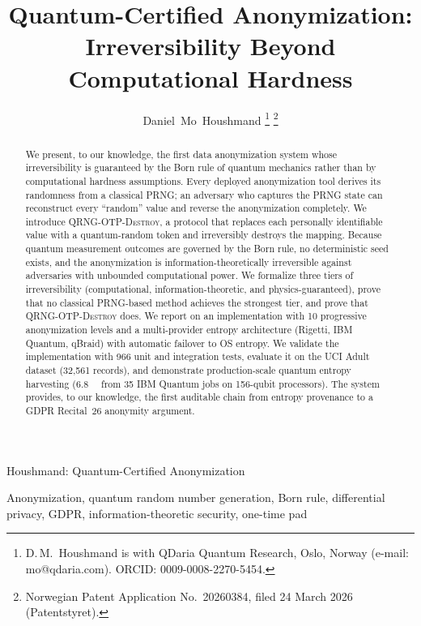 \documentclass[journal]{IEEEtran}
\begin{document}
\title{Quantum-Certified Anonymization: Irreversibility Beyond Computational Hardness}

\author{Daniel~Mo~Houshmand%
\thanks{D.\,M.\ Houshmand is with QDaria Quantum Research, Oslo, Norway (e-mail: mo@qdaria.com). ORCID: 0009-0008-2270-5454.}%
\thanks{Norwegian Patent Application No.\ 20260384, filed 24 March 2026 (Patentstyret).}}

%
{Houshmand: Quantum-Certified Anonymization}

\maketitle

\begin{abstract}
We present, to our knowledge, the first data anonymization system whose irreversibility is guaranteed by the Born rule of quantum mechanics rather than by computational hardness assumptions. Every deployed anonymization tool derives its randomness from a classical PRNG; an adversary who captures the PRNG state can reconstruct every ``random'' value and reverse the anonymization completely. We introduce \textsc{QRNG-OTP-Destroy}, a protocol that replaces each personally identifiable value with a quantum-random token and irreversibly destroys the mapping. Because quantum measurement outcomes are governed by the Born rule, no deterministic seed exists, and the anonymization is information-theoretically irreversible against adversaries with unbounded computational power. We formalize three tiers of irreversibility (computational, information-theoretic, and physics-guaranteed), prove that no classical PRNG-based method achieves the strongest tier, and prove that \textsc{QRNG-OTP-Destroy} does. We report on an implementation with 10 progressive anonymization levels and a multi-provider entropy architecture (Rigetti, IBM Quantum, qBraid) with automatic failover to OS entropy. We validate the implementation with 966 unit and integration tests, evaluate it on the UCI Adult dataset (32,561 records), and demonstrate production-scale quantum entropy harvesting (\SI{6.8}{\mega\byte} from 35 IBM Quantum jobs on 156-qubit processors). The system provides, to our knowledge, the first auditable chain from entropy provenance to a GDPR Recital~26 anonymity argument.
\end{abstract}

\begin{IEEEkeywords}
Anonymization, quantum random number generation, Born rule, differential privacy, GDPR, information-theoretic security, one-time pad
\end{IEEEkeywords}
\end{document}
